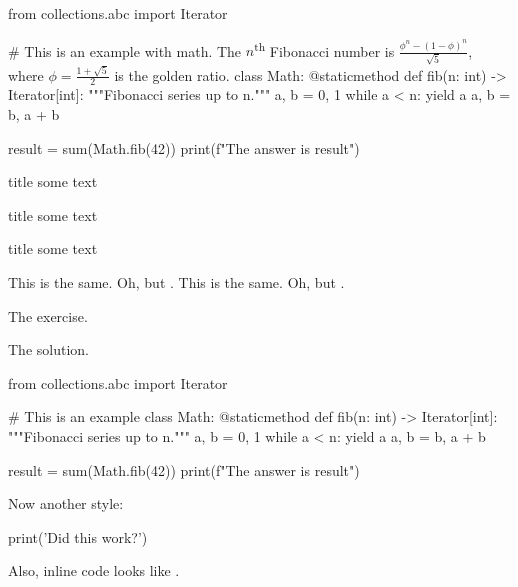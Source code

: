 \documentclass{article}
\begin{document}
\begin{python}
    from collections.abc import Iterator
    
    # This is an example with math. The $n$\textsuperscript{th} Fibonacci number is $\frac{\phi^n-(1-\phi)^n}{\sqrt{5}}$, where $\phi=\frac{1+\sqrt{5}}{2}$ is the golden ratio.
    class Math:
        @staticmethod
        def fib(n: int) -> Iterator[int]:
            """Fibonacci series up to n."""
            a, b = 0, 1
            while a < n:
                yield a
                a, b = b, a + b
    
    result = sum(Math.fib(42))
    print(f"The answer is {result}")
\end{python}

\begin{filingbox}{title}
    some text
\end{filingbox}

\begin{railingbox}{title}
    some text
\end{railingbox}

\begin{flagbox}{title}
    some text
\end{flagbox}

\DeclareDocumentCommand{\NOT}{}{\textcolor{red}{\textbf{NOT}}\xspace}

This is \NOT the same. Oh, but \NOT. This is \NOT* the same. Oh, but \NOT*.

\begin{exercise}
    The exercise.
\end{exercise}
\begin{solution}
    The solution.
    \begin{python}
        from collections.abc import Iterator

        
        # This is an example
        class Math:
            @staticmethod
            def fib(n: int) -> Iterator[int]:
                """Fibonacci series up to n."""
                a, b = 0, 1
                while a < n:
                    yield a
                    a, b = b, a + b
        
        
        result = sum(Math.fib(42))
        print(f"The answer is {result}")
    \end{python}
    Now another style:
    \begin{python*}
        print('Did this work?')
    \end{python*}
    Also, inline code looks like .
\end{solution}
\end{document}

